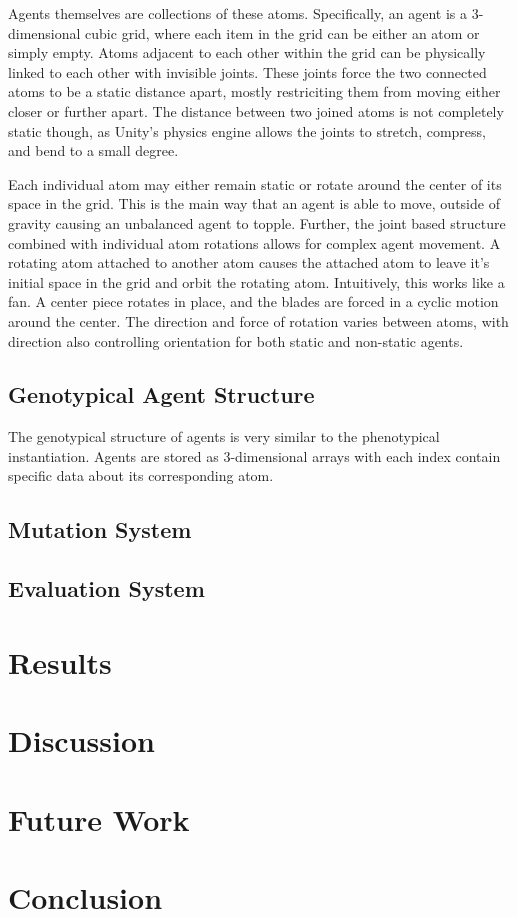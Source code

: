 \documentclass[runningheads]{llncs}
\begin{document}
Agents themselves are collections of these atoms.
Specifically, an agent is a 3-dimensional cubic grid, where each item in the grid can be either an atom or simply empty.
Atoms adjacent to each other within the grid can be physically linked to each other with invisible joints. 
These joints force the two connected atoms to be a static distance apart, mostly restriciting them from moving either closer or further apart.
The distance between two joined atoms is not completely static though, as Unity's physics engine allows the joints to stretch, compress, and bend to a small degree.

Each individual atom may either remain static or rotate around the center of its space in the grid.
This is the main way that an agent is able to move, outside of gravity causing an unbalanced agent to topple.
Further, the joint based structure combined with individual atom rotations allows for complex agent movement.
A rotating atom attached to another atom causes the attached atom to leave it's initial space in the grid and orbit the rotating atom.
Intuitively, this works like a fan.
A center piece rotates in place, and the blades are forced in a cyclic motion around the center.
The direction and force of rotation varies between atoms, with direction also controlling orientation for both static and non-static agents.

\subsection{Genotypical Agent Structure}

The genotypical structure of agents is very similar to the phenotypical instantiation.
Agents are stored as 3-dimensional arrays with each index contain specific data about its corresponding atom.


\subsection{Mutation System}

\subsection{Evaluation System}

\section{Results}

\section{Discussion}

\section{Future Work}

\section{Conclusion}
\end{document}
